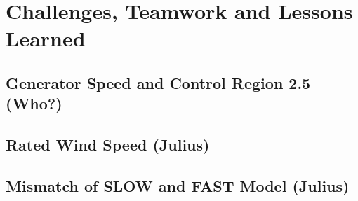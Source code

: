 \chapter{Challenges, Teamwork and Lessons Learned}

\section{Generator Speed and Control Region 2.5 (Who?)}

\section{Rated Wind Speed (Julius)} \label{RatedWindSpeed}


\section{Mismatch of SLOW and FAST Model (Julius)}

